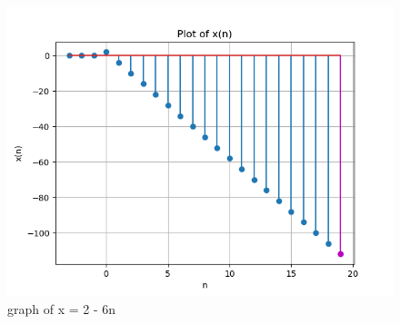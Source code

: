 \documentclass[journal,12pt,twocolumn]{IEEEtran}
\theoremstyle{remark}
\begin{document}
    \begin{figure}[ht]
    \renewcommand\thefigure{1}
        \centering
        \includegraphics[width=1\linewidth]{figs/Figure_1.png}
        \caption{graph of x = 2 - 6n}
    \end{figure}
\end{document}
